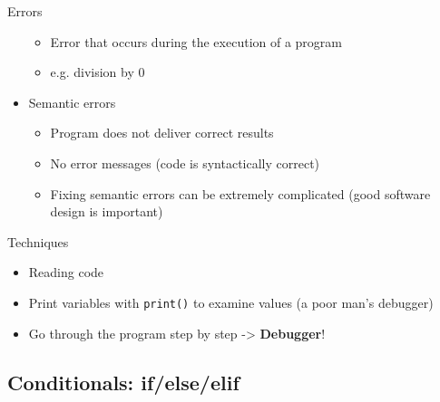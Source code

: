 \documentclass[10pt, a4paper]{beamer} %
\begin{document}
\begin{frame}[c,allowframebreaks]
\begin{block}{Errors}
\begin{itemize}
            \begin{itemize}
              \item Error that occurs during the execution of a program
              \item e.g. division by 0
            \end{itemize}
      \item Semantic errors
            \begin{itemize}
              \item Program does not deliver correct results
              \item No error messages (code is syntactically correct)
              \item Fixing semantic errors can be extremely complicated (good software design is important)
            \end{itemize}
    \end{itemize}
  \end{block}
  \framebreak
  \begin{block}{Techniques}
    \begin{itemize}
      \item Reading code
      \item Print variables with \lstinline!print()! to examine values (a poor man's debugger)
      \item Go through the program step by step -> \textbf{Debugger}!
    \end{itemize}
  \end{block}



\end{frame}

\subsection{Conditionals: if/else/elif} %
\label{sub:conditionals}
\end{document}

